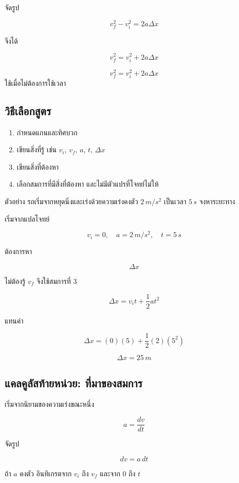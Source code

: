 \documentclass[12pt,a4paper]{report}
\begin{document}
จัดรูป

\[
v_f^2-v_i^2=2a\Delta x
\]

จึงได้

\[
v_f^2=v_i^2+2a\Delta x
\]

\begin{tcolorbox}[title=สมการที่ 4]
\[
v_f^2=v_i^2+2a\Delta x
\]
ใช้เมื่อไม่ต้องการใช้เวลา
\end{tcolorbox}

\subsection{วิธีเลือกสูตร}

\begin{enumerate}
    \item กำหนดแกนและทิศบวก
    \item เขียนสิ่งที่รู้ เช่น $v_i$, $v_f$, $a$, $t$, $\Delta x$
    \item เขียนสิ่งที่ต้องหา
    \item เลือกสมการที่มีสิ่งที่ต้องหา และไม่มีตัวแปรที่โจทย์ไม่ให้
\end{enumerate}

\begin{examplebox}{ตัวอย่าง}
รถเริ่มจากหยุดนิ่งและเร่งด้วยความเร่งคงตัว $2\,\si{m/s^2}$ เป็นเวลา $5\,\si{s}$ จงหาระยะทาง

เริ่มจากแปลโจทย์

\[
v_i=0,\quad a=2\,\si{m/s^2},\quad t=5\,\si{s}
\]

ต้องการหา

\[
\Delta x
\]

ไม่ต้องรู้ $v_f$ จึงใช้สมการที่ 3

\[
\Delta x=v_it+\frac{1}{2}at^2
\]

แทนค่า

\[
\Delta x=(0)(5)+\frac{1}{2}(2)(5^2)
\]

\[
\Delta x=25\,\si{m}
\]
\end{examplebox}

\subsection{แคลคูลัสท้ายหน่วย: ที่มาของสมการ}

เริ่มจากนิยามของความเร่งขณะหนึ่ง

\[
a=\frac{dv}{dt}
\]

จัดรูป

\[
dv=a\,dt
\]

ถ้า $a$ คงตัว อินทิเกรตจาก $v_i$ ถึง $v_f$ และจาก $0$ ถึง $t$
\end{document}
